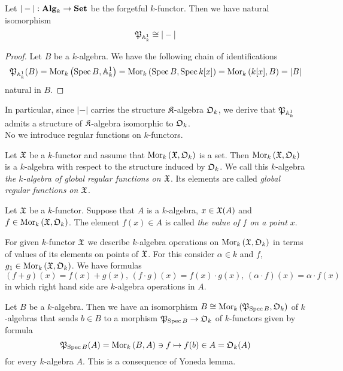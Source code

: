 \begin{fact}\label{fact:affineline_as_forgetfulfunctor}
Let $|-|:\mathbf{Alg}_k\rightarrow \mathbf{Set}$ be the forgetful $k$-functor. Then we have natural isomorphism
$${\mathfrak P}_{\mathbb{A}^1_k} \cong |-|$$
\end{fact}
\begin{proof}
Let $B$ be a $k$-algebra. We have the following chain of identifications
$${\mathfrak P}_{\mathbb{A}^1_k}(B) = \mathrm{Mor}_k\left(\mathrm{Spec}\, B, \mathbb{A}^1_k\right) = \mathrm{Mor}_k\left(\mathrm{Spec}\, B, \mathrm{Spec}\, k[x]\right) = \mathrm{Mor}_k\left(k[x], B\right) = |B|$$
natural in $B$.
\end{proof}
\noindent
In particular, since $|-|$ carries the structure ${\mathfrak K}$-algebra ${\mathfrak O}_k$, we derive that ${\mathfrak P}_{\mathbb{A}^1_k}$ admits a structure of ${\mathfrak K}$-algebra isomorphic to ${\mathfrak O}_k$.\\
No we introduce regular functions on $k$-functors.

\begin{definition}
Let ${\mathfrak X}$ be a $k$-functor and assume that $\mathrm{Mor}_k\left({\mathfrak X}, {\mathfrak O}_k\right)$ is a set. Then $\mathrm{Mor}_k\left({\mathfrak X}, {\mathfrak O}_k\right)$ is a $k$-algebra with respect to the structure induced by ${\mathfrak O}_k$. We call this $k$-algebra \textit{the $k$-algebra of global regular functions on ${\mathfrak X}$}. Its elements are called \textit{global regular functions on ${\mathfrak X}$}.
\end{definition}

\begin{definition}
Let ${\mathfrak X}$ be a $k$-functor. Suppose that $A$ is a $k$-algebra, $x\in {\mathfrak X}(A)$ and $f\in \mathrm{Mor}_k\left({\mathfrak X},{\mathfrak O}_k\right)$. The element $f(x) \in A$ is called \textit{the value of $f$ on a point $x$}.
\end{definition}
\noindent
For given $k$-functor ${\mathfrak X}$ we describe $k$-algebra operations on $\mathrm{Mor}_k\left({\mathfrak X},{\mathfrak O}_k\right)$ in terms of values of its elements on points of ${\mathfrak X}$. For this consider $\alpha \in k$ and $f$, $g_1\in \mathrm{Mor}_k\left({\mathfrak X}, {\mathfrak O}_k\right)$. We have formulas
$$\left(f+g\right)(x) = f(x)+g(x),\,\left(f\cdot g\right)(x) = f(x)\cdot g(x),\,\left(\alpha \cdot f\right)(x) = \alpha \cdot f(x)$$
in which right hand side are $k$-algebra operations in $A$.

\begin{remark}\label{remark:values_of_regular_functions_for_affine_k_schemes}
Let $B$ be a $k$-algebra. Then we have an isomorphism $B\cong \mathrm{Mor}_k\left({\mathfrak P}_{\mathrm{Spec}\, B},{\mathfrak O}_k\right)$ of $k$-algebras that sends $b\in B$ to a morphism ${\mathfrak P}_{\mathrm{Spec}\, B}\rightarrow {\mathfrak O}_k$ of $k$-functors given by formula
$${\mathfrak P}_{\mathrm{Spec}\, B}(A) = \mathrm{Mor}_k\left(B,A\right)\ni f \mapsto f(b)\in A = {\mathfrak O}_k(A)$$
for every $k$-algebra $A$. This is a consequence of Yoneda lemma.
\end{remark}


